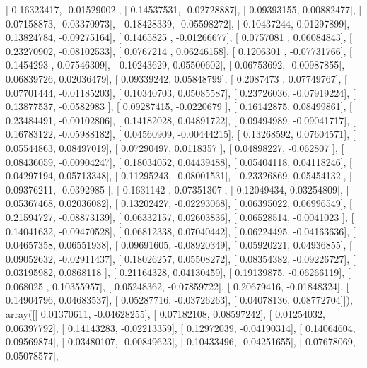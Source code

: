 \documentclass{article}
\begin{document}
       [ 0.16323417, -0.01529002],
       [ 0.14537531, -0.02728887],
       [ 0.09393155,  0.00882477],
       [ 0.07158873, -0.03370973],
       [ 0.18428339, -0.05598272],
       [ 0.10437244,  0.01297899],
       [ 0.13824784, -0.09275164],
       [ 0.1465825 , -0.01266677],
       [ 0.0757081 ,  0.06084843],
       [ 0.23270902, -0.08102533],
       [ 0.0767214 ,  0.06246158],
       [ 0.1206301 , -0.07731766],
       [ 0.1454293 ,  0.07546309],
       [ 0.10243629,  0.05500602],
       [ 0.06753692, -0.00987855],
       [ 0.06839726,  0.02036479],
       [ 0.09339242,  0.05848799],
       [ 0.2087473 ,  0.07749767],
       [ 0.07701444, -0.01185203],
       [ 0.10340703,  0.05085587],
       [ 0.23726036, -0.07919224],
       [ 0.13877537, -0.0582983 ],
       [ 0.09287415, -0.0220679 ],
       [ 0.16142875,  0.08499861],
       [ 0.23484491, -0.00102806],
       [ 0.14182028,  0.04891722],
       [ 0.09494989, -0.09041717],
       [ 0.16783122, -0.05988182],
       [ 0.04560909, -0.00444215],
       [ 0.13268592,  0.07604571],
       [ 0.05544863,  0.08497019],
       [ 0.07290497,  0.0118357 ],
       [ 0.04898227, -0.062807  ],
       [ 0.08436059, -0.00904247],
       [ 0.18034052,  0.04439488],
       [ 0.05404118,  0.04118246],
       [ 0.04297194,  0.05713348],
       [ 0.11295243, -0.08001531],
       [ 0.23326869,  0.05454132],
       [ 0.09376211, -0.0392985 ],
       [ 0.1631142 ,  0.07351307],
       [ 0.12049434,  0.03254809],
       [ 0.05367468,  0.02036082],
       [ 0.13202427, -0.02293068],
       [ 0.06395022,  0.06996549],
       [ 0.21594727, -0.08873139],
       [ 0.06332157,  0.02603836],
       [ 0.06528514, -0.0041023 ],
       [ 0.14041632, -0.09470528],
       [ 0.06812338,  0.07040442],
       [ 0.06224495, -0.04163636],
       [ 0.04657358,  0.06551938],
       [ 0.09691605, -0.08920349],
       [ 0.05920221,  0.04936855],
       [ 0.09052632, -0.02911437],
       [ 0.18026257,  0.05508272],
       [ 0.08354382, -0.09226727],
       [ 0.03195982,  0.0868118 ],
       [ 0.21164328,  0.04130459],
       [ 0.19139875, -0.06266119],
       [ 0.068025  ,  0.10355957],
       [ 0.05248362, -0.07859722],
       [ 0.20679416, -0.01848324],
       [ 0.14904796,  0.04683537],
       [ 0.05287716, -0.03726263],
       [ 0.04078136,  0.08772704]]), array([[ 0.01370611, -0.04628255],
       [ 0.07182108,  0.08597242],
       [ 0.01254032,  0.06397792],
       [ 0.14143283, -0.02213359],
       [ 0.12972039, -0.04190314],
       [ 0.14064604,  0.09569874],
       [ 0.03480107, -0.00849623],
       [ 0.10433496, -0.04251655],
       [ 0.07678069,  0.05078577],
\end{document}

